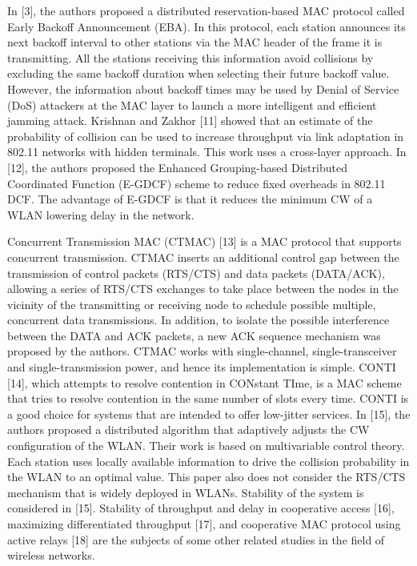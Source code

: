 \documentclass[10pt,twocolumn,oneside,submit]{JCNtran}
\begin{document}
In [3], the authors proposed a distributed reservation-based MAC protocol called Early Backoff Announcement (EBA). In this protocol, each station announces its next backoff interval to other stations via the MAC header of the frame it is transmitting. All the stations receiving this information avoid collisions by excluding the same backoff duration when selecting their future backoff value. However, the information about backoff times may be used by Denial of Service (DoS) attackers at the MAC layer to launch a more intelligent and efficient jamming attack. Krishnan and Zakhor [11] showed that an estimate of the probability of collision can be used to increase throughput via link adaptation in 802.11 networks with hidden terminals. This work uses a cross-layer approach. In [12], the authors proposed the Enhanced Grouping-based Distributed Coordinated Function (E-GDCF) scheme to reduce fixed overheads in 802.11 DCF. The advantage of E-GDCF is that it reduces the minimum CW of a WLAN lowering delay in the network.

Concurrent Transmission MAC (CTMAC) [13] is a MAC protocol that supports concurrent transmission. CTMAC inserts an additional control gap between the transmission of control packets (RTS/CTS) and data packets (DATA/ACK), allowing a series of RTS/CTS exchanges to take place between the nodes in the vicinity of the transmitting or receiving node to schedule possible multiple, concurrent data transmissions. In addition, to isolate the possible interference between the DATA and ACK packets, a new ACK sequence mechanism was proposed by the authors. CTMAC works with single-channel, single-transceiver and single-transmission power, and hence its implementation is simple. CONTI [14], which attempts to resolve contention in CONstant TIme, is a MAC scheme that tries to resolve contention in the same number of slots every time. CONTI is a good choice for systems that are intended to offer low-jitter services. In [15], the authors proposed a distributed algorithm that adaptively adjusts the CW configuration of the WLAN. Their work is based on multivariable control theory. Each station uses locally available information to drive the collision probability in the WLAN to an optimal value. This paper also does not consider the RTS/CTS mechanism that is widely deployed in WLANs. Stability of the system is considered in [15]. Stability of throughput and delay in cooperative access [16], maximizing differentiated throughput [17], and cooperative MAC protocol using active relays [18] are the subjects of some other related studies in the field of wireless networks.
\end{document}
